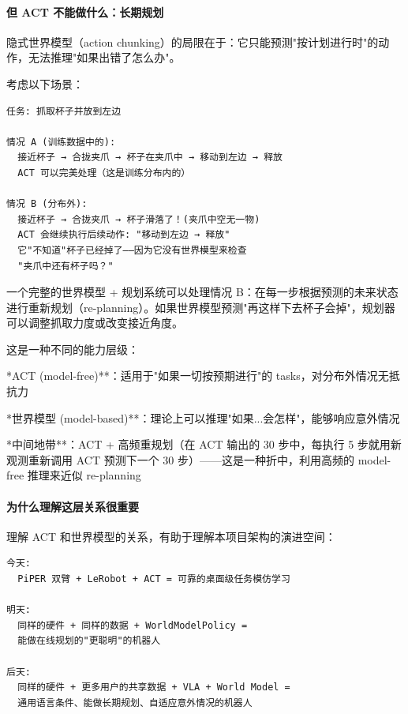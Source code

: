 \documentclass[UTF8,a4paper,11pt]{ctexart}
\begin{document}
{\paragraph{但 ACT 不能做什么：长期规划}


隐式世界模型（action chunking）的局限在于：它只能预测"按计划进行时"的动作，无法推理"如果出错了怎么办"。

考虑以下场景：

\begin{lstlisting}[language=text]
任务: 抓取杯子并放到左边

情况 A (训练数据中的):
  接近杯子 → 合拢夹爪 → 杯子在夹爪中 → 移动到左边 → 释放
  ACT 可以完美处理（这是训练分布内的）

情况 B (分布外):
  接近杯子 → 合拢夹爪 → 杯子滑落了！(夹爪中空无一物)
  ACT 会继续执行后续动作: "移动到左边 → 释放"
  它"不知道"杯子已经掉了——因为它没有世界模型来检查
  "夹爪中还有杯子吗？"
\end{lstlisting}

一个完整的世界模型 + 规划系统可以处理情况 B：在每一步根据预测的未来状态进行重新规划（re-planning）。如果世界模型预测"再这样下去杯子会掉"，规划器可以调整抓取力度或改变接近角度。

这是一种不同的能力层级：
\item **ACT (model-free)**：适用于"如果一切按预期进行"的 tasks，对分布外情况无抵抗力
\item **世界模型 (model-based)**：理论上可以推理"如果...会怎样"，能够响应意外情况
\item **中间地带**：ACT + 高频重规划（在 ACT 输出的 30 步中，每执行 5 步就用新观测重新调用 ACT 预测下一个 30 步）——这是一种折中，利用高频的 model-free 推理来近似 re-planning

\paragraph{为什么理解这层关系很重要}


理解 ACT 和世界模型的关系，有助于理解本项目架构的演进空间：

\begin{lstlisting}[language=text]
今天:
  PiPER 双臂 + LeRobot + ACT = 可靠的桌面级任务模仿学习

明天:
  同样的硬件 + 同样的数据 + WorldModelPolicy =
  能做在线规划的"更聪明"的机器人

后天:
  同样的硬件 + 更多用户的共享数据 + VLA + World Model =
  通用语言条件、能做长期规划、自适应意外情况的机器人
\end{lstlisting}

}
\end{document}
